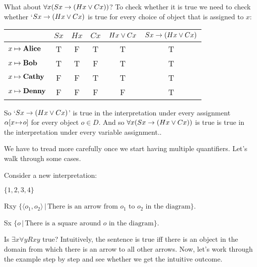 What about $\forall x(Sx\eif (Hx\eor Cx))$? To check whether it is true we need to check whether `$Sx\eif(Hx\eor Cx)$ is true for every choice of object that is assigned to $x$:
\begin{center}
\begin{tabular}{l|ccccc}
&$Sx$&$Hx$&$Cx$&$Hx\eor Cx$&$Sx\eif (Hx\eor Cx)$\Bstrut\\\hline\Tstrut
$x\mapsto\text{\emph{Alice}}$&T&F&T&T&T\\
$x\mapsto \text{\emph{Bob}}$&T&T&F&T&T\\
$x\mapsto \text{\emph{Cathy}}$&F&F&T&T&T\\
$x\mapsto \text{\emph{Denny}}$&F&F&F&F&T
\end{tabular}
\end{center}
So `$Sx\eif (Hx\eor Cx)$'  is true in the interpretation under every assignment $\varvariant{\alpha}{x}{o}$ for every object $o\in D$. And so $\forall x(Sx\eif (Hx\eor Cx))$ is true is true in the interpretation under every variable assignment..



We have to tread more carefully once we start having multiple quantifiers. Let's walk through some cases.

Consider a new interpretation: \begin{center}

 \begin{ekey}
\item[\text{domain}] $\{1,2,3,4\}$
\item[Rxy] $\{\langle o_1,o_2\rangle\,|\,\text{There is an arrow from $o_1$ to $o_2$ in the diagram}\}$.
\item[Sx] $\{o\,|\,\text{There is a square around $o$ in the diagram}\}$.
\end{ekey}
\end{center}

 Is $\exists x\forall y Rxy$ true? Intuitively, the sentence is true iff there is an object in the domain from which there is an arrow to all other arrows. Now, let's work through the example step by step and see whether we get the intuitive outcome.


